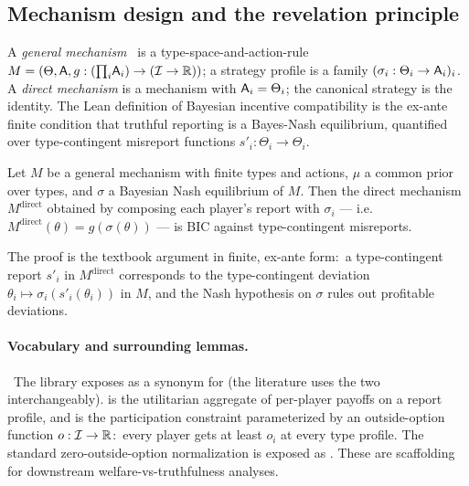 \subsection{Mechanism design and the revelation principle}
\label{sec:mech:revelation}

A \emph{general mechanism}~\citep{Myerson1981} is a
type-space-and-action-rule
$M = (\Theta, \mathsf{A}, g : ({\textstyle\prod_i}\mathsf{A}_i) \to (\mathcal{I} \to \mathbb{R}))$;
a strategy profile is a family $(\sigma_i : \Theta_i \to \mathsf{A}_i)_i$.
A \emph{direct mechanism} is a mechanism with $\mathsf{A}_i = \Theta_i$;
the canonical strategy is the identity.  The Lean definition
of Bayesian incentive compatibility is the ex-ante finite condition
that truthful reporting is a Bayes-Nash equilibrium, quantified over
type-contingent misreport functions
$s'_i : \Theta_i \to \Theta_i$.

\begin{theorem}
\label{thm:revelation}
Let $M$ be a general mechanism with finite types and actions, $\mu$
a common prior over types, and $\sigma$ a Bayesian Nash equilibrium
of $M$.  Then the direct mechanism
$M^{\mathrm{direct}}$ obtained by composing each player's report with
$\sigma_i$ — i.e.\ $M^{\mathrm{direct}}(\theta) = g(\sigma(\theta))$ —
is BIC against type-contingent misreports.
\end{theorem}

\noindent The proof is the textbook argument in finite, ex-ante
form:\ a type-contingent report $s'_i$ in $M^{\mathrm{direct}}$
corresponds to the type-contingent deviation
$\theta_i \mapsto \sigma_i(s'_i(\theta_i))$ in $M$, and the Nash
hypothesis on $\sigma$ rules out profitable deviations.


\paragraph{Vocabulary and surrounding lemmas.}\
The library exposes  as a synonym for
 (the literature uses the two interchangeably).
 is the utilitarian aggregate of
per-player payoffs on a report profile, and
 is the participation constraint
parameterized by an outside-option function $o : \mathcal{I} \to
\mathbb{R}$:\ every player gets at least $o_i$ at every type profile.
The standard zero-outside-option normalization is exposed as
.  These are scaffolding for downstream
welfare-vs-truthfulness analyses.

